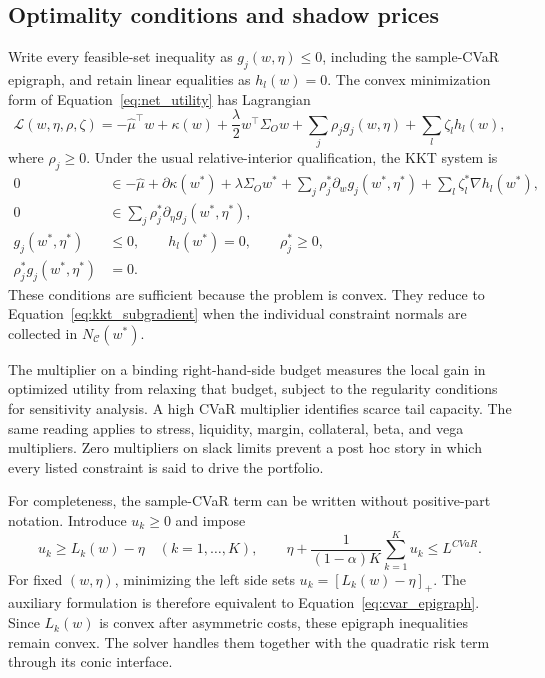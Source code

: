 \subsection{Optimality conditions and shadow prices}\label{app:kkt_proof}

Write every feasible-set inequality as \(g_j(w,\eta)\le0\), including the sample-CVaR
epigraph, and retain linear equalities as \(h_l(w)=0\). The convex minimization form of
Equation~\eqref{eq:net_utility} has Lagrangian
\begin{equation}
  \mathcal L(w,\eta,\rho,\zeta)
  =-\widehat\mu^\top w+\kappa(w)
   +\frac{\lambda}{2}w^\top\Sigma_Ow
   +\sum_j\rho_jg_j(w,\eta)+\sum_l\zeta_lh_l(w),
  \label{eq:app_lagrangian}
\end{equation}
where \(\rho_j\ge0\). Under the usual relative-interior qualification, the KKT system is
\begin{align}
  0&\in-\widehat\mu+\partial\kappa(w^*)+\lambda\Sigma_Ow^*
       +\sum_j\rho_j^*\partial_w g_j(w^*,\eta^*)
       +\sum_l\zeta_l^*\nabla h_l(w^*), \label{eq:app_kkt_w}\\
  0&\in\sum_j\rho_j^*\partial_\eta g_j(w^*,\eta^*), \label{eq:app_kkt_eta}\\
  g_j(w^*,\eta^*)&\le0,\qquad h_l(w^*)=0,\qquad \rho_j^*\ge0, \nonumber\\
  \rho_j^*g_j(w^*,\eta^*)&=0. \label{eq:app_kkt_comp}
\end{align}
These conditions are sufficient because the problem is convex. They reduce to
Equation~\eqref{eq:kkt_subgradient} when the individual constraint normals are collected
in \(N_{\mathcal C}(w^*)\).

The multiplier on a binding right-hand-side budget measures the local gain in optimized
utility from relaxing that budget, subject to the regularity conditions for sensitivity
analysis. A high CVaR multiplier identifies scarce tail capacity. The same reading applies
to stress, liquidity, margin, collateral, beta, and vega multipliers. Zero multipliers on
slack limits prevent a post hoc story in which every listed constraint is said to drive
the portfolio.

For completeness, the sample-CVaR term can be written without positive-part notation.
Introduce \(u_k\ge0\) and impose
\begin{equation}
  u_k\ge L_k(w)-\eta\quad(k=1,\ldots,K),
  \qquad
  \eta+\frac{1}{(1-\alpha)K}\sum_{k=1}^K u_k\le L^{CVaR}.
  \label{eq:app_cvar_linearization}
\end{equation}
For fixed \((w,\eta)\), minimizing the left side sets
\(u_k=[L_k(w)-\eta]_+\). The auxiliary formulation is therefore equivalent to
Equation~\eqref{eq:cvar_epigraph}. Since \(L_k(w)\) is convex after asymmetric costs,
these epigraph inequalities remain convex. The solver handles them together with the
quadratic risk term through its conic interface.

